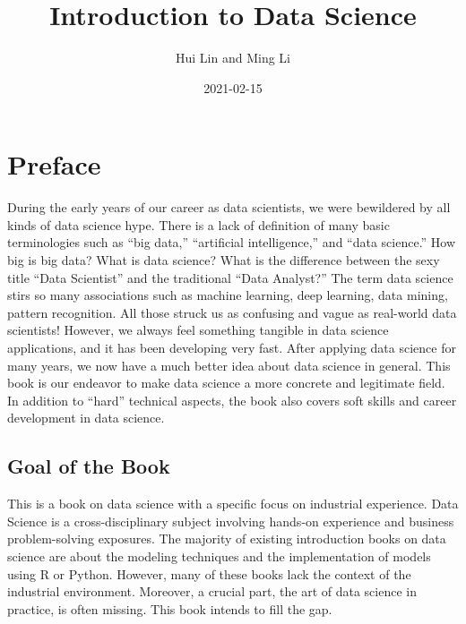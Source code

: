 \documentclass[12pt,]{krantz}
\title{Introduction to Data Science}
\author{Hui Lin and Ming Li}
\date{2021-02-15}
\begin{document}
\maketitle

\thispagestyle{empty}
\begin{center}
\end{center}

\setlength{\abovedisplayskip}{-5pt}
\setlength{\abovedisplayshortskip}{-5pt}

{
\hypersetup{linkcolor=}
\setcounter{tocdepth}{2}
\tableofcontents
}
\listoftables
\listoffigures
\hypertarget{preface}{%
\chapter*{Preface}\label{preface}}


During the early years of our career as data scientists, we were bewildered by all kinds of data science hype. There is a lack of definition of many basic terminologies such as ``big data,'' ``artificial intelligence,'' and ``data science.'' How big is big data? What is data science? What is the difference between the sexy title ``Data Scientist'' and the traditional ``Data Analyst?'' The term data science stirs so many associations such as machine learning, deep learning, data mining, pattern recognition. All those struck us as confusing and vague as real-world data scientists! However, we always feel something tangible in data science applications, and it has been developing very fast. After applying data science for many years, we now have a much better idea about data science in general. This book is our endeavor to make data science a more concrete and legitimate field. In addition to ``hard'' technical aspects, the book also covers soft skills and career development in data science.

\hypertarget{goal-of-the-book}{%
\section*{Goal of the Book}\label{goal-of-the-book}}


This is a book on data science with a specific focus on industrial experience. Data Science is a cross-disciplinary subject involving hands-on experience and business problem-solving exposures. The majority of existing introduction books on data science are about the modeling techniques and the implementation of models using R or Python. However, many of these books lack the context of the industrial environment. Moreover, a crucial part, the art of data science in practice, is often missing. This book intends to fill the gap.
\end{document}
